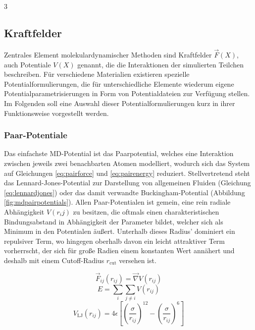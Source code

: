 3\subsection{Kraftfelder}
\label{mdforcefields}

Zentrales Element molekulardynamischer Methoden sind Kraftfelder $\vec F(X)$, auch Potentiale $V(X)$ genannt, die die Interaktionen der simulierten Teilchen beschreiben.
Für verschiedene Materialien existieren spezielle Potentialformulierungen, die für unterschiedliche Elemente wiederum eigene Potentialparametrisierungen in Form von Potentialdateien zur Verfügung stellen.
Im Folgenden soll eine Auswahl dieser Potentialformulierungen kurz in ihrer Funktionsweise vorgestellt werden.

\subsubsection{Paar-Potentiale}

Das einfachste MD-Potential ist das Paarpotential, welches eine Interaktion zwischen jeweils zwei benachbarten Atomen modelliert, wodurch sich das System auf Gleichungen \ref{eq:pairforce} und \ref{eq:pairenergy} reduziert.
Stellvertretend steht das Lennard-Jones-Potential zur Darstellung von allgemeinen Fluiden (Gleichung \ref{eq:lennardjones}) oder das damit verwandte Bucking\-ham-Potential (Abbildung \ref{fig:mdpairpotentials}).
Allen Paar-Potentialen ist gemein, eine rein radiale Abhängigkeit $V(r_ij)$ zu besitzen, die oftmals einen charakteristischen Bindungsabstand in Abhängigkeit der Parameter bildet, welcher sich als Minimum in den Potentialen äußert.
Unterhalb dieses Radius' dominiert ein repulsiver Term, wo hingegen oberhalb davon ein leicht attraktiver Term vorherrscht, der sich für große Radien einem konstanten Wert annähert und deshalb mit einem Cutoff-Radius $r_\text{cut}$ versehen ist.

\begin{equation}
  \label{eq:pairforce}
  \vec F_{ij}(r_{ij}) = \vec\nabla V(r_{ij})
\end{equation}
\begin{equation}
  \label{eq:pairenergy}
  E = \sum_i\sum_{j \neq i}{V(r_{ij})}
\end{equation}
\begin{equation}
  \label{eq:lennardjones}
  V_\text{LJ}(r_{ij}) = 4 \epsilon \left[\left(\frac{\sigma}{r_{ij}}\right)^{12} - \left(\frac{\sigma}{r_{ij}}\right)^{6}\right]
\end{equation}

